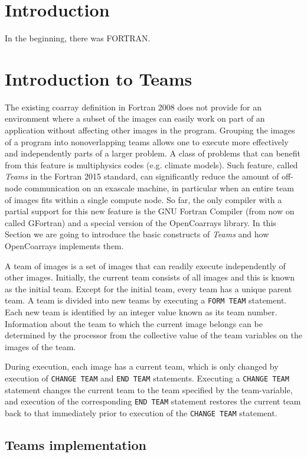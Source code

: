 \section{Introduction}
In the beginning, there was FORTRAN.

\section{Introduction to Teams}\label{sec:teams}
The existing coarray definition in Fortran 2008 does not provide for an environment
where a subset of the images can easily work on part of an application without affecting
other images in the program.  Grouping the images of a program into nonoverlapping
teams allows one to execute more effectively and independently parts of a larger
problem.  A class of problems that can benefit from this feature is multiphysics codes
(e.g.  climate models).
Such feature, called \textit{Teams} in the Fortran 2015 standard, can significantly reduce the amount of off-node
communication on an exascale machine, in particular when an entire team of images
fits within a single compute node.
So far, the only compiler with a partial support for this new feature is the GNU Fortran Compiler (from now on
called GFortran) and a special version of the OpenCoarrays library.
In this Section we are going to introduce the basic constructs of \textit{Teams} and how OpenCoarrays implements them.

A team of images is a set of images that can readily execute independently of other images.
Initially, the current team consists of all images and this is
known as the initial team. Except for the initial team, every team has a unique parent team. A team is divided
into new teams by executing a \texttt{FORM TEAM} statement.
Each new team is identified by an integer value known
as its team number. Information about the team to which the current image belongs can be determined by the
processor from the collective value of the team variables on the images of the team.

During execution, each image has a current team, which is only changed by execution of \texttt{CHANGE TEAM} and
\texttt{END TEAM} statements. Executing a \texttt{CHANGE TEAM} statement changes the current team to the team specified
by the team-variable, and execution of the corresponding \texttt{END TEAM} statement restores the current team back
to that immediately prior to execution of the \texttt{CHANGE TEAM} statement.

\subsection{Teams implementation}\label{subsec:teams_implementation}

